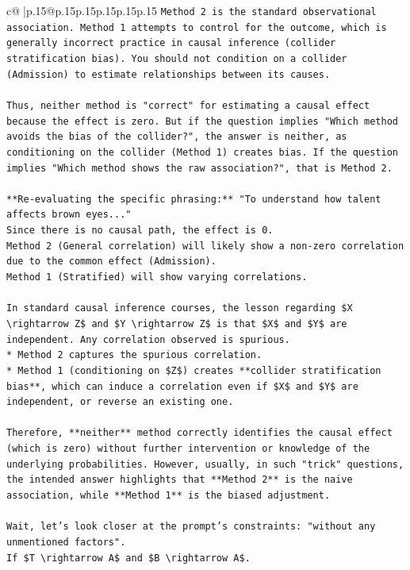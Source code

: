 \documentclass{article}
\begin{document}
{\begin{supertabular}{c@{$\;$}|p{.15\linewidth}@{}p{.15\linewidth}p{.15\linewidth}p{.15\linewidth}p{.15\linewidth}p{.15\linewidth}}
{{{\texttt{Method 2 is the standard observational association. Method 1 attempts to control for the outcome, which is generally incorrect practice in causal inference (collider stratification bias). You should not condition on a collider (Admission) to estimate relationships between its causes.} \\
\\ 
\texttt{Thus, neither method is "correct" for estimating a causal effect because the effect is zero. But if the question implies "Which method avoids the bias of the collider?", the answer is neither, as conditioning on the collider (Method 1) creates bias. If the question implies "Which method shows the raw association?", that is Method 2.} \\
\\ 
\texttt{**Re{-}evaluating the specific phrasing:** "To understand how talent affects brown eyes..."} \\
\texttt{Since there is no causal path, the effect is 0.} \\
\texttt{Method 2 (General correlation) will likely show a non{-}zero correlation due to the common effect (Admission).} \\
\texttt{Method 1 (Stratified) will show varying correlations.} \\
\\ 
\texttt{In standard causal inference courses, the lesson regarding \$X \textbackslash{}rightarrow Z\$ and \$Y \textbackslash{}rightarrow Z\$ is that \$X\$ and \$Y\$ are independent. Any correlation observed is spurious.} \\
\texttt{*   Method 2 captures the spurious correlation.} \\
\texttt{*   Method 1 (conditioning on \$Z\$) creates **collider stratification bias**, which can induce a correlation even if \$X\$ and \$Y\$ are independent, or reverse an existing one.} \\
\\ 
\texttt{Therefore, **neither** method correctly identifies the causal effect (which is zero) without further intervention or knowledge of the underlying probabilities. However, usually, in such "trick" questions, the intended answer highlights that **Method 2** is the naive association, while **Method 1** is the biased adjustment.} \\
\\ 
\texttt{Wait, let's look closer at the prompt's constraints: "without any unmentioned factors".} \\
\texttt{If \$T \textbackslash{}rightarrow A\$ and \$B \textbackslash{}rightarrow A\$.} \\
}}}
\end{supertabular}}
\end{document}
